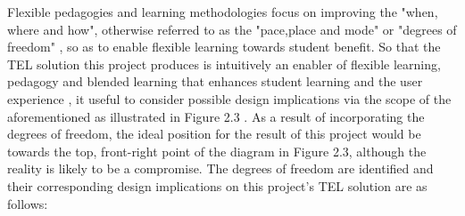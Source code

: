 Flexible pedagogies and learning methodologies focus on improving the "when, where and how", otherwise referred to as the "pace,place and mode" or "degrees of freedom" \cite{Gordon2014}, so as to enable flexible learning towards student benefit. So that the TEL solution this project produces is intuitively an enabler of flexible learning, pedagogy and blended learning that enhances student learning and the user experience \cite{Cubukcuo2012,Gordon2014,Team2008}, it useful to consider possible design implications via the scope of the aforementioned as illustrated in Figure 2.3 \cite{Gordon2014}. As a result of incorporating the degrees of freedom, the ideal position for the result of this project would be towards the top, front-right point of the diagram in Figure 2.3, although the reality is likely to be a compromise. The degrees of freedom are identified and their corresponding design implications on this project's TEL solution are as follows:

